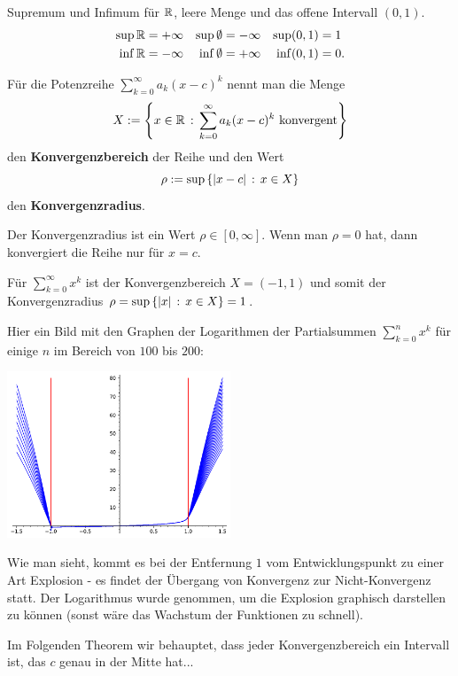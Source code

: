 \begin{bsp}
	Supremum und Infimum für $\mathbb{R}$, leere Menge und das offene Intervall $(0,1)$. 
	\begin{align*}
		\sup \mathbb{R} & = + \infty  &  \sup \emptyset & = - \infty & \sup (0,1) & = 1
		\\ \inf \mathbb{R} & = -\infty & \inf \emptyset & = +\infty & \inf (0,1)  & = 0. 
	\end{align*}
\end{bsp} 

\begin{defn}
	Für die Potenzreihe $\sum_{k=0}^\infty a_k (x-c)^k$ nennt man die Menge 
	\[
		 X:= \left\{ x \in \mathbb{R} \,:\, \sum_{k=0}^\infty a_k (x-c)^k \ \text{konvergent} \right\} 
	\]
	den \textbf{Konvergenzbereich} der Reihe und den Wert 
	\[
		\rho := \sup \left\{ |x-c| \,:\, x \in X \right\}
	\]
	den \textbf{Konvergenzradius}. 
\end{defn} 


\begin{bem}
	Der Konvergenzradius ist ein Wert $\rho \in [0,\infty]$. Wenn man $\rho=0$ hat, dann konvergiert die Reihe nur für $x=c$. 
\end{bem} 

\begin{bsp}
	Für $\sum_{k=0}^\infty x^k$ ist der Konvergenzbereich $X = (-1,1)$ und somit der Konvergenzradius $\rho = \sup \left\{ |x| \,:\, x \in X \right\} = 1$.  

	Hier ein Bild mit den Graphen der Logarithmen der Partialsummen $\sum_{k=0}^n x^k$ für einige $n$ im Bereich von $100$ bis $200$: 
 \begin{center} 	
			\includegraphics[width=0.5\textwidth]{pics/konvergenzradius_potenzreihe.pdf}
	\end{center} 
	Wie man sieht, kommt es bei der Entfernung $1$ vom Entwicklungspunkt zu einer Art Explosion  - es findet der Übergang von Konvergenz zur Nicht-Konvergenz statt. Der Logarithmus  wurde  genommen, um die Explosion graphisch darstellen zu können (sonst wäre das Wachstum der Funktionen zu schnell). 
	
	Im Folgenden Theorem wir behauptet, dass jeder Konvergenzbereich ein Intervall ist, das $c$ genau in der Mitte hat...
\end{bsp} 

